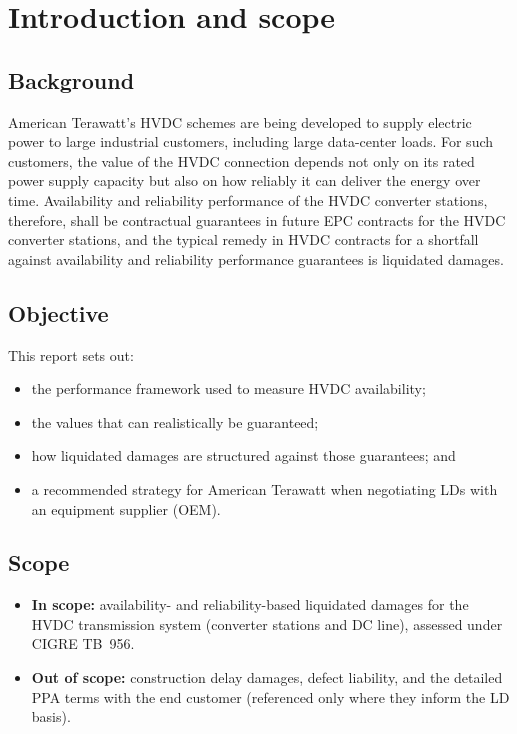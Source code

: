 \section{Introduction and scope}

\subsection{Background}
American Terawatt’s HVDC schemes are being developed to supply electric power to large industrial customers, 
including large data-center loads. For such customers, the value of the HVDC connection depends not only on 
its rated power supply capacity but also on how reliably it can deliver the energy over time. Availability and 
reliability performance of the HVDC converter stations, therefore, shall be contractual guarantees in future EPC 
contracts for the HVDC converter stations, and  the typical remedy in HVDC contracts for a shortfall against availability 
and reliability performance guarantees is liquidated damages.

\subsection{Objective}
This report sets out:
\begin{itemize}\setlength{\itemsep}{0.15em}
  \item[(i)] the performance framework used to measure HVDC availability;
  \item[(ii)] the values that can realistically be guaranteed;
  \item[(iii)] how liquidated damages are structured against those guarantees;
        and
  \item[(iv)] a recommended strategy for American Terawatt when negotiating LDs
        with an equipment supplier (OEM).
\end{itemize}

\subsection{Scope}
\begin{itemize}
  \item \textbf{In scope:} availability- and reliability-based liquidated
        damages for the HVDC transmission system (converter stations and DC
        line), assessed under CIGRE TB~956.
  \item \textbf{Out of scope:} construction delay damages, defect liability, and
        the detailed PPA terms with the end customer (referenced only where they
        inform the LD basis).
\end{itemize}

